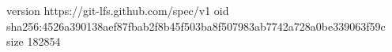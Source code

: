version https://git-lfs.github.com/spec/v1
oid sha256:4526a390138aef87fbab2f8b45f503ba8f507983ab7742a728a0be339063f59c
size 182854
